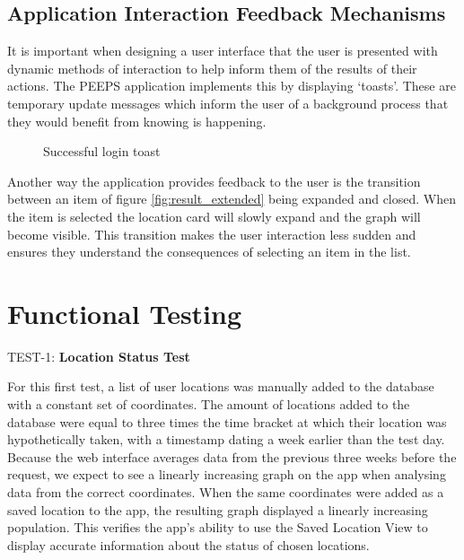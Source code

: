 \subsection{Application Interaction Feedback Mechanisms}
It is important when designing a user interface that the user is presented with dynamic methods of interaction to help inform them of the results of their actions. The PEEPS application implements this by displaying ‘toasts’. These are temporary update messages which inform the user of a background process that they would benefit from knowing is happening. 

\begin{figure}[ht]
    \centering
    \caption{Successful login toast}
    \label{fig:result_toast}
\end{figure}

Another way the application provides feedback to the user is the transition between an item of figure \ref{fig:result_extended} being expanded and closed. When the item is selected the location card will slowly expand and the graph will become visible. This transition makes the user interaction less sudden and ensures they understand the consequences of selecting an item in the list.

\section{Functional Testing}
TEST-1: \textbf{Location Status Test}

For this first test, a list of user locations was manually added to the database with a constant set of coordinates. The amount of locations added to the database were equal to three times the time bracket at which their location was hypothetically taken, with a timestamp dating a week earlier than the test day. Because the web interface averages data from the previous three weeks before the request, we expect to see a linearly increasing graph on the app when analysing data from the correct coordinates.
When the same coordinates were added as a saved location to the app, the resulting graph displayed a linearly increasing population. This verifies the app’s ability to use the Saved Location View to display accurate information about the status of chosen locations.

